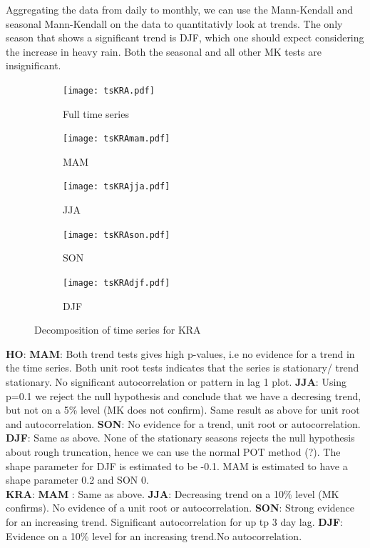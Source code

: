 \documentclass{article}
\begin{document}
	Aggregating the data from daily to monthly, we can use the Mann-Kendall and seasonal Mann-Kendall on the data to quantitativly look at trends. The only season that shows a significant trend is DJF, which one should expect considering the increase in heavy rain. Both the seasonal and all other MK tests are insignificant. 
	\begin{figure}[H]
		\centering
		\begin{subfigure}{0.6\textwidth}
			\centering
			\texttt{[image: tsKRA.pdf]}
			\caption{Full time series}
		\end{subfigure}
		\begin{subfigure}{0.5\textwidth}
			\centering
			\texttt{[image: tsKRAmam.pdf]}
			\caption{MAM}
		\end{subfigure}%
		\begin{subfigure}{0.5\textwidth}
			\centering
			\texttt{[image: tsKRAjja.pdf]}
			\caption{JJA}
		\end{subfigure}
		\begin{subfigure}{0.5\textwidth}
			\centering
			\texttt{[image: tsKRAson.pdf]}
			\caption{SON}
		\end{subfigure}%
		\begin{subfigure}{0.5\textwidth}
			\centering
			\texttt{[image: tsKRAdjf.pdf]}
			\caption{DJF}
		\end{subfigure}%
		\caption{Decomposition of time series for KRA}
		\label{tsKRA}
	\end{figure}
	

	{\Large\textbf{HO}}: \textbf{MAM}: Both trend tests gives high p-values, i.e no evidence for a trend in the time series. Both unit root tests indicates that the series is stationary/ trend stationary. No significant autocorrelation or pattern in lag 1 plot.
	\textbf{JJA}: Using p=0.1 we reject the null hypothesis and conclude that we have a decresing trend, but not on a 5\% level (MK does not confirm). Same result as above for unit root and autocorrelation.
	\textbf{SON}: No evidence for a trend, unit root or autocorrelation. 
	\textbf{DJF}: Same as above.
	None of the stationary seasons rejects the null hypothesis about rough truncation, hence we can use the normal POT method (?). The shape parameter for DJF is estimated to be -0.1. MAM is estimated to have a shape parameter 0.2 and SON 0.\\
	
	{\Large\textbf{KRA}}: \textbf{MAM} : Same as above. \textbf{JJA}: Decreasing trend on a 10\% level (MK confirms). No evidence of a unit root or autocorrelation. \textbf{SON}: Strong evidence for an increasing trend. Significant autocorrelation for up tp 3 day lag. \textbf{DJF}: Evidence on a 10\% level for an increasing trend.No autocorrelation. \\
	
\end{document}
